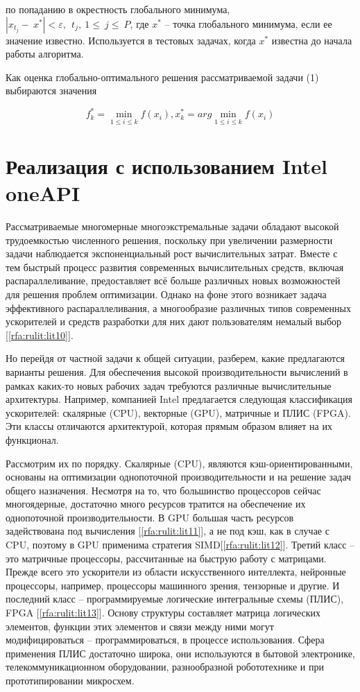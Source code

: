 \documentclass[10pt,a4paper]{book}
\begin{document}
	по попаданию в окрестность глобального минимума, $\left|x_{t_j}-\ x^\ast\right|<\varepsilon,\ \ t_j,\ 1\le\ j\le\ P$, где $x^\ast$ -- точка глобального минимума, если ее значение известно. Используется в тестовых задачах, когда $x^\ast$ известна до начала работы алгоритма.
	
Как оценка глобально-оптимального решения рассматриваемой задачи (1) выбираются значения 


\begin{equation}
f_k^*=\min_{1\leqslant i \leqslant k}f(x_i), x_k^*=arg \min_{1\leqslant i \leqslant k}f(x_i)
\end{equation}




\section{Реализация с использованием Intel oneAPI}


Рассматриваемые многомерные многоэкстремальные задачи обладают высокой трудоемкостью численного решения, поскольку при увеличении размерности задачи наблюдается экспоненциальный рост вычислительных затрат. Вместе с тем быстрый процесс развития современных вычислительных средств, включая распараллеливание, предоставляет всё больше различных новых возможностей для решения проблем оптимизации. Однако на фоне этого возникает задача эффективного распараллеливания, а многообразие различных типов современных ускорителей и средств разработки для них дают пользователям немалый выбор [\ref{rfa:rulit:lit10}].

Но перейдя от частной задачи к общей ситуации, разберем, какие предлагаются варианты решения. Для обеспечения высокой производительности вычислений в рамках каких-то новых рабочих задач требуются различные вычислительные архитектуры. Например, компанией Intel предлагается следующая классификация ускорителей: скалярные (CPU), векторные (GPU), матричные и ПЛИС (FPGA). Эти классы отличаются архитектурой, которая прямым образом влияет на их функционал.
 
Рассмотрим их по порядку. Скалярные (CPU), являются кэш-ориентированными, основаны на оптимизации однопоточной производительности и на решение задач общего назначения. Несмотря на то, что большинство процессоров сейчас многоядерные, достаточно много ресурсов тратится на обеспечение их однопоточной производительности. В GPU большая часть ресурсов задействована под вычисления [\ref{rfa:rulit:lit11}], а не под кэш, как в случае с CPU, поэтому в GPU применима стратегия SIMD[\ref{rfa:rulit:lit12}].   Третий класс -- это матричные процессоры, рассчитанные на быструю работу с матрицами. Прежде всего это ускорители из области искусственного интеллекта, нейронные процессоры, например, процессоры машинного зрения, тензорные и другие. И последний класс -- программируемые логические интегральные схемы (ПЛИС), FPGA [\ref{rfa:rulit:lit13}]. Основу структуры составляет матрица логических элементов, функции этих элементов и связи между ними могут модифицироваться – программироваться, в процессе использования. Сфера применения ПЛИС достаточно широка, они используются в бытовой электронике, телекоммуникационном оборудовании, разнообразной робототехнике и при прототипировании микросхем.
\end{document}
